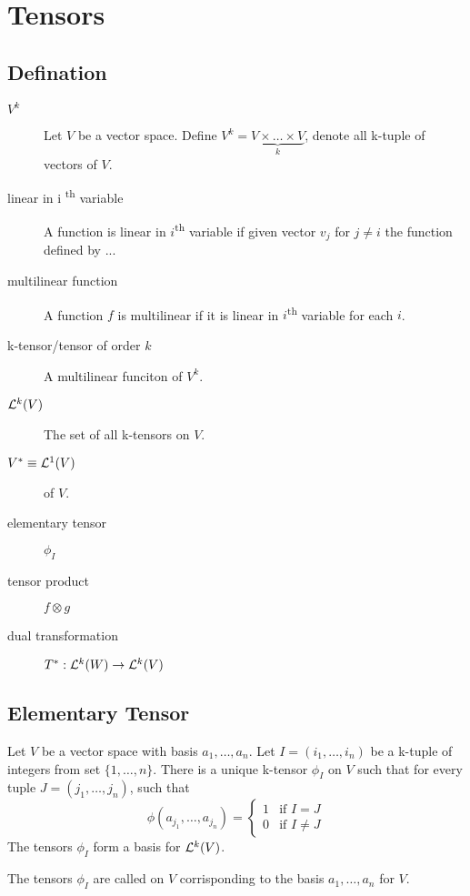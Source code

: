 \section{Tensors}

\secttoc

\subsection{Defination}

\begin{description}
\item[$V^k$]
Let $V$ be a vector space. Define $V^k=\underbrace{V\times\ldots\times V}_{k}$, denote all k-tuple of vectors of $V$.
\item[linear in i \textsuperscript{th} variable]
A function is linear in $i$\textsuperscript{th} variable if given vector $v_j$ for $j\neq i$ the function defined by ...\TODO
\item[multilinear function]
A function $f$ is multilinear if it is linear in $i$\textsuperscript{th} variable for each $i$.
\item[k-tensor/tensor of order $k$] A multilinear funciton of $V^k$.
\item[${\mathcal L}^k(V)$] The set of all k-tensors on $V$.
\item[$V^*\equiv {\mathcal L}^1(V)$]  of $V$.
\item[elementary tensor] $\phi_I$
\item[tensor product] $f\otimes g$
\item[dual transformation] $T^*:{\mathcal L}^k(W)\to{\mathcal L}^k(V)$
\end{description}

\subsection{Elementary Tensor}

Let $V$ be a vector space with basis $a_1, \ldots, a_n$.
Let $I=(i_1, \ldots, i_n)$ be a k-tuple of integers from set $\{1,\ldots, n\}$.
There is a unique k-tensor $\phi_I$ on $V$ such that for every tuple $J=(j_1, \ldots, j_n)$, such that
\[\phi(a_{j_1},\ldots,a_{j_n})=\begin{cases}1&\text{if }I=J\\0&\text{if }I\neq J\end{cases}\]
The tensors $\phi_I$ form a basis for ${\mathcal L}^k(V)$.

The tensors $\phi_I$ are called  on $V$ corrisponding to the basis $a_1, \ldots, a_n$ for $V$.

